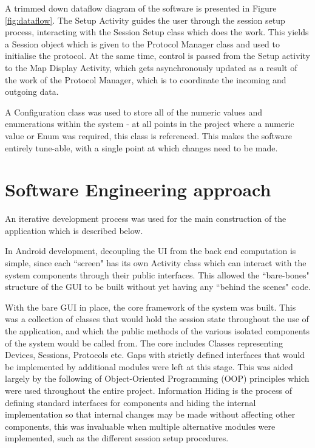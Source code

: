 A trimmed down dataflow diagram of the software is presented in Figure \ref{fig:dataflow}. The Setup Activity guides the user through the session setup process, interacting with the Session Setup class which does the work. This yields a Session object which is given to the Protocol Manager class and used to initialise the protocol. At the same time, control is passed from the Setup activity to the Map Display Activity, which gets asynchronously updated as a result of the work of the Protocol Manager, which is to coordinate the incoming and outgoing data.

A Configuration class was used to store all of the numeric values and enumerations within the system - at all points in the project where a numeric value or Enum was required, this class is referenced. This makes the software entirely tune-able, with a single point at which changes need to be made.

\section{Software Engineering approach}
An iterative development process was used for the main construction of the application which is described below.

In Android development, decoupling the UI from the back end computation is simple, since each ``screen" has its own Activity class which can interact with the system components through their public interfaces. This allowed the ``bare-bones" structure of the GUI to be built without yet having any ``behind the scenes" code.

With the bare GUI in place, the core framework of the system was built. This was a collection of classes that would hold the session state throughout the use of the application, and which the public methods of the various isolated components of the system would be called from. The core includes Classes representing Devices, Sessions, Protocols etc.
Gaps with strictly defined interfaces that would be implemented by additional modules were left at this stage. This was aided largely by the following of Object-Oriented Programming (OOP) principles which were used throughout the entire project.
Information Hiding is the process of defining standard interfaces for components and hiding the internal implementation so that internal changes may be made without affecting other components, this was invaluable when multiple alternative modules were implemented, such as the different session setup procedures.

